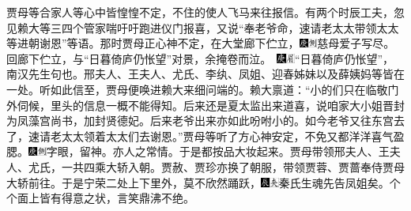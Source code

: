 {{贾母等合家人等心中皆惶惶不定，不住的使人飞马来往报信。有两个时辰工夫，忽见赖大等三四个管家喘吁吁跑进仪门报喜，又说“奉老爷命，速请老太太带领太太等进朝谢恩”等语。那时贾母正心神不定，在大堂廊下伫立，{\includegraphics[width=3mm]{../Images/00004}\includegraphics[width=3mm]{../Images/00011}\footnotesize \kaishu 慈母爱子写尽。回廊下伫立，与“日暮倚庐仍怅望”对景，余掩卷而泣。　\includegraphics[width=3mm]{../Images/00004}\includegraphics[width=3mm]{../Images/00010}\footnotesize \kaishu “日暮倚庐仍怅望”，南汉先生句也。}邢夫人、王夫人、尤氏、李纨、凤姐、迎春姊妹以及薛姨妈等皆在一处。听如此信至，贾母便唤进赖大来细问端的。赖大禀道：“小的们只在临敬门外伺候，里头的信息一概不能得知。后来还是夏太监出来道喜，说咱家大小姐晋封为凤藻宫尚书，加封贤德妃。后来老爷出来亦如此吩咐小的。如今老爷又往东宫去了，速请老太太领着太太们去谢恩。”贾母等听了方心神安定，不免又都洋洋喜气盈腮。{\includegraphics[width=3mm]{../Images/00004}\includegraphics[width=3mm]{../Images/00011}\footnotesize \kaishu 字眼，留神。亦人之常情。}于是都按品大妆起来。贾母带领邢夫人、王夫人、尤氏，一共四乘大轿入朝。贾赦、贾珍亦换了朝服，带领贾蓉、贾蔷奉侍贾母大轿前往。于是宁荣二处上下里外，莫不欣然踊跃，{\includegraphics[width=3mm]{../Images/00009}\includegraphics[width=3mm]{../Images/00012}\footnotesize \kaishu 秦氏生魂先告凤姐矣。}个个面上皆有得意之状，言笑鼎沸不绝。

}}
